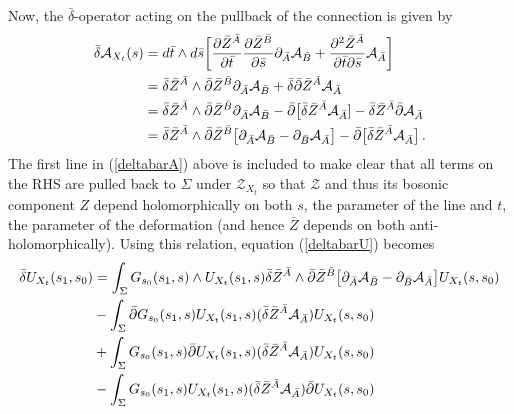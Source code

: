 \documentclass[12pt]{article}
\numberwithin{equation}{section}
\begin{document}
Now, the $\bar{\delta}$-operator acting on the pullback of the connection is given by
\begin{align}
\bar{\delta} \mathcal{A}_{X_t}(s) 
&= d \bar{t} \wedge d \bar{s} \biggl[\frac{\partial \bar{Z}^{\bar{A}}}{\partial \bar{t}} \frac{\partial \bar{Z}^{\bar{B}}}{\partial \bar{s}} \partial_{\bar A} \mathcal{A}_{\bar B} + \frac{\partial^2 \bar{Z}^{\bar{A}}}{\partial \bar{t} \partial {\bar{s}}} \mathcal{A}_{\bar{A}}\biggr] \notag \\
&= \bar{\delta} \bar{Z}^{\bar A} \wedge \bar{\partial} \bar{Z}^{\bar B} \partial_{\bar A} \mathcal{A}_{\bar B}  + \bar{\delta} \bar{\partial} \bar{Z}^{\bar A}  \mathcal{A}_{\bar A} \notag \\
&= \bar{\delta} \bar{Z}^{\bar A} \wedge \bar{\partial} \bar{Z}^{\bar B} \partial_{\bar A} \mathcal{A}_{\bar B}  - \bar{\partial} \bigl[\bar{\delta} \bar{Z}^{\bar A}  \mathcal{A}_{\bar A}] - \bar{\delta} \bar{Z}^{\bar A}  \bar{\partial} \mathcal{A}_{\bar A} \notag \\
&= \bar{\delta} \bar{Z}^{\bar A} \wedge \bar{\partial} \bar{Z}^{\bar B} \bigl[\partial_{\bar A} \mathcal{A}_{\bar B}  - \partial_{\bar B} \mathcal{A}_{\bar A} \bigr] - \bar{\partial} \bigl[\bar{\delta} \bar{Z}^{\bar A}  \mathcal{A}_{\bar A}\bigr] \,. 
\label{deltabarA}
\end{align}
The first line in (\ref{deltabarA}) above is included to make clear that all terms on the RHS are pulled back to $\Sigma$ under $\mathcal{Z}_{X_t}$ so that $\mathcal{Z}$ and thus its bosonic component $Z$ depend holomorphically on both $s$, the parameter of the line and $t$, the parameter of the deformation (and hence $\bar{Z}$ depends on both anti-holomorphically).
Using this relation, equation (\ref{deltabarU}) becomes
\begin{align}
\bar{\delta} U_{X_t}(s_1,s_0) &= \int_\Sigma G_{s_0}(s_1,s) \wedge U_{X_t}(s_1,s) \bar{\delta} \bar{Z}^{\bar A} \wedge \bar{\partial} \bar{Z}^{\bar B} \bigl[\partial_{\bar A} \mathcal{A}_{\bar B} - \partial_{\bar B} \mathcal{A}_{\bar A}\bigr] U_{X_t}(s,s_0) \notag \\
&- \int_\Sigma \bar{\partial} G_{s_0}(s_1,s) U_{X_t}(s_1,s) (\bar{\delta} \bar{Z}^{\bar{A}}\mathcal{A}_{\bar{A}}) U_{X_t}(s,s_0) \notag \\
&+ \int_\Sigma  G_{s_0}(s_1,s) \bar{\partial} U_{X_t}(s_1,s) (\bar{\delta} \bar{Z}^{\bar{A}}\mathcal{A}_{\bar{A}}) U_{X_t}(s,s_0) \notag \\
&- \int_\Sigma  G_{s_0}(s_1,s)  U_{X_t}(s_1,s) (\bar{\delta} \bar{Z}^{\bar{A}}\mathcal{A}_{\bar{A}}) \bar{\partial} U_{X_t}(s,s_0) 
\end{align}
\end{document}
